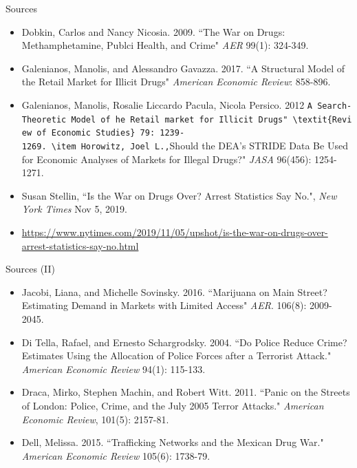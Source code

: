 \documentclass[10pt,ignorenonframetext,]{beamer}
\providecommand{\tightlist}{%
  \setlength{\itemsep}{0pt}\setlength{\parskip}{0pt}}
\begin{document}
\begin{frame}[fragile]{Sources}
\protect\hypertarget{sources}{}

\begin{itemize}
\tightlist
\item
  Dobkin, Carlos and Nancy Nicosia. 2009. ``The War on Drugs:
  Methamphetamine, Publci Health, and Crime" \textit{AER} 99(1):
  324-349.
\item
  Galenianos, Manolis, and Alessandro Gavazza. 2017. ``A Structural
  Model of the Retail Market for Illicit Drugs"
  \textit{American Economic Review}: 858-896.
\item
  Galenianos, Manolis, Rosalie Liccardo Pacula, Nicola Persico. 2012
  \texttt{A\ Search-Theoretic\ Model\ of\ he\ Retail\ market\ for\ Illicit\ Drugs"\ \textbackslash{}textit\{Review\ of\ Economic\ Studies\}\ 79:\ 1239-1269.\ \textbackslash{}item\ Horowitz,\ Joel\ L.,}Should
  the DEA's STRIDE Data Be Used for Economic Analyses of Markets for
  Illegal Drugs?" \textit{JASA} 96(456): 1254-1271.
\item
  Susan Stellin, ``Is the War on Drugs Over? Arrest Statistics Say No.",
  \textit{New York Times} Nov 5, 2019.
\item
  \url{https://www.nytimes.com/2019/11/05/upshot/is-the-war-on-drugs-over-arrest-statistics-say-no.html}
\end{itemize}

\end{frame}

\begin{frame}{Sources (II)}
\protect\hypertarget{sources-ii}{}

\begin{itemize}
\tightlist
\item
  Jacobi, Liana, and Michelle Sovinsky. 2016. ``Marijuana on Main
  Street? Estimating Demand in Markets with Limited Access"
  \textit{AER}. 106(8): 2009-2045.
\item
  Di Tella, Rafael, and Ernesto Schargrodsky. 2004. ``Do Police Reduce
  Crime? Estimates Using the Allocation of Police Forces after a
  Terrorist Attack." \textit{American Economic Review} 94(1): 115-133.
\item
  Draca, Mirko, Stephen Machin, and Robert Witt. 2011. ``Panic on the
  Streets of London: Police, Crime, and the July 2005 Terror Attacks."
  \textit{American Economic Review}, 101(5): 2157-81.
\item
  Dell, Melissa. 2015. ``Trafficking Networks and the Mexican Drug War."
  \textit{American Economic Review} 105(6): 1738-79.
\end{itemize}

\end{frame}
\end{document}
